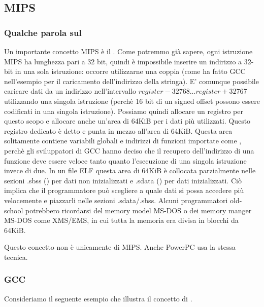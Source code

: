 \subsection{MIPS}

\subsubsection{Qualche parola sul }
\label{MIPS_GP}


Un importante concetto MIPS è il .
Come potremmo già sapere, ogni istruzione MIPS ha lunghezza pari a 32 bit, quindi è impossibile inserire un indirizzo a 32-bit
in una sola istruzione: occorre utilizzarne una coppia
(come ha fatto GCC nell'esempio per il caricamento dell'indirizzo della stringa).
E' comunque possibile caricare dati da un indirizzo nell'intervallo $register-32768...register+32767$ utilizzando una singola istruzione
(perchè 16 bit di un signed offset possono essere codificati in una singola istruzione).
Possiamo quindi allocare un registro per questo scopo e allocare anche un'area di 64KiB per i dati più utilizzati.
Questo registro dedicato è detto  e punta in mezzo all'area di 64KiB.
Questa area solitamente contiene variabili globali e indirizzi di funzioni importate come \printf, perchè gli sviluppatori di GCC hanno deciso
che il recupero dell'indirizzo di una funzione deve essere veloce tanto quanto l'esecuzione
di una singola istruzione invece di due.
In un file ELF questa area di 64KiB è collocata parzialmente nelle sezioni .sbss () per dati non inizializzati
e .sdata () per dati inizializzati.
Ciò implica che il programmatore può scegliere a quale dati si possa accedere più velocemente e piazzarli nelle sezioni
.sdata/.sbss.
Alcuni programmatori old-school potrebbero ricordarsi del memory model MS-DOS 
o dei memory manger MS-DOS come XMS/EMS, in cui tutta la memoria era divisa in blocchi da 64KiB.


Questo concetto non è unicamente di MIPS. Anche PowerPC usa la stessa tecnica.

\subsubsection{\Optimizing GCC}

Consideriamo il seguente esempio che illustra il concetto di .

